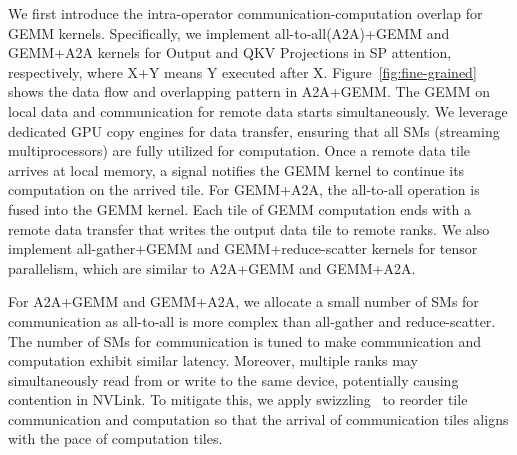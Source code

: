 

 We first introduce the intra-operator communication-computation overlap for GEMM kernels.
Specifically, we implement all-to-all(A2A)+GEMM and GEMM+A2A kernels for Output and QKV Projections in SP attention, respectively, 
where X+Y means Y executed after X.
Figure~\ref{fig:fine-grained} shows the data flow and overlapping pattern in A2A+GEMM. 
The GEMM on local data and communication for remote data starts simultaneously. We leverage dedicated GPU copy engines for data transfer, ensuring that all SMs (streaming multiprocessors) are fully utilized for computation. Once a remote data tile arrives at local memory, a signal notifies the GEMM kernel to continue its computation on the arrived tile.
For GEMM+A2A, the all-to-all operation is fused into the GEMM kernel. Each tile of GEMM computation ends with a remote data transfer that writes the output data tile to remote ranks. 
We also implement all-gather+GEMM and GEMM+reduce-scatter kernels for tensor parallelism, which are similar to A2A+GEMM and GEMM+A2A.

For A2A+GEMM and GEMM+A2A, we allocate a small number of SMs for communication as all-to-all is more complex than all-gather and reduce-scatter. The number of SMs for communication is tuned to make communication and computation exhibit similar latency.
Moreover, multiple ranks may simultaneously read from or write to the same device, potentially causing contention in NVLink. To mitigate this, we apply swizzling~\cite{chang2024flux, zhang2025comet, zheng2025tilelink} to reorder tile communication and computation so that the arrival of communication tiles aligns with the pace of computation tiles.

